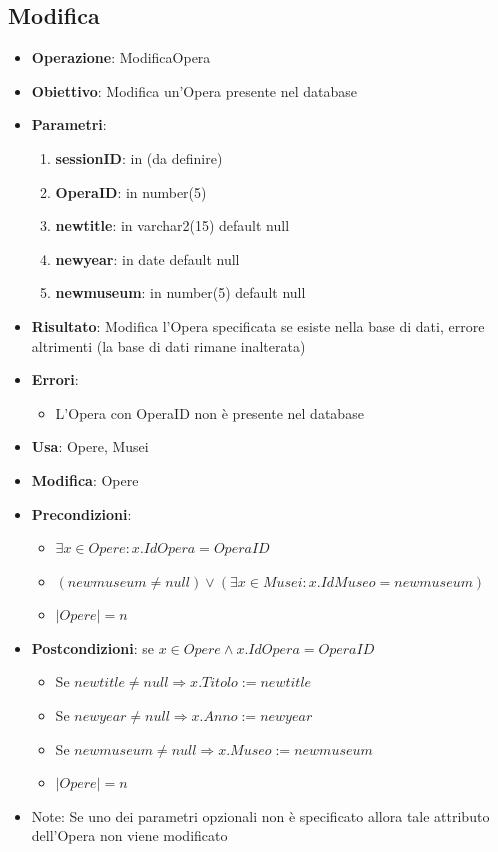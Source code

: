 \documentclass[a4paper,11pt]{article}
\begin{document}
\subsection{Modifica}
\begin{itemize}
	\item \textbf{Operazione}: ModificaOpera
	\item \textbf{Obiettivo}: Modifica un'Opera presente nel database
	\item \textbf{Parametri}:
	\begin{enumerate}
		\item \textbf{sessionID}: in (da definire)
		\item \textbf{OperaID}: in number(5)
		\item \textbf{newtitle}: in varchar2(15) default null
		\item \textbf{newyear}: in date default null
		\item \textbf{newmuseum}: in number(5) default null
	\end{enumerate}
	\item \textbf{Risultato}: Modifica l'Opera specificata se esiste nella base di dati, errore altrimenti (la base di dati rimane inalterata)
	\item \textbf{Errori}: 
	\begin{itemize}
		\item L'Opera con OperaID non è presente nel database
	\end{itemize}
	\item \textbf{Usa}: Opere, Musei
	\item \textbf{Modifica}: Opere
	\item \textbf{Precondizioni}:
	\begin{itemize}
		\item $\exists x \in Opere : x.IdOpera = OperaID$
		\item $(newmuseum \ne null) \lor (\exists x \in Musei : x.IdMuseo = newmuseum)$
		\item $|Opere| = n$
	\end{itemize}
	\item \textbf{Postcondizioni}: se $x \in Opere \land x.IdOpera = OperaID$
	\begin{itemize}
		\item Se $newtitle \ne null \Rightarrow x.Titolo := newtitle$
		\item Se $newyear \ne null \Rightarrow x.Anno := newyear$
		\item Se $newmuseum \ne null \Rightarrow x.Museo := newmuseum$
		\item $|Opere| = n$
	\end{itemize}
	\item Note: Se uno dei parametri opzionali non è specificato allora tale attributo 
	dell'Opera non viene modificato
\end{itemize}
\end{document}
